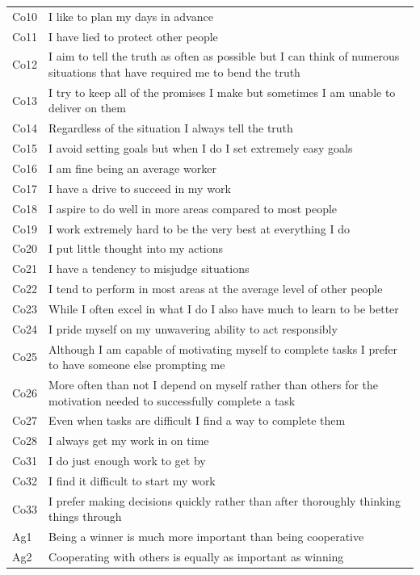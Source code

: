 \documentclass[man]{apa6}
\begin{document}
\begin{longtable}{ll}
\addlinespace
Co10 & I like to plan my days in advance\\
Co11 & I have lied to protect other people\\
Co12 & I aim to tell the truth as often as possible  but I can think of numerous situations that have required me to bend the truth\\
Co13 & I try to keep all of the promises I make  but sometimes I am unable to deliver on them\\
Co14 & Regardless of the situation  I always tell the truth\\
\addlinespace
Co15 & I avoid setting goals  but when I do  I set extremely easy goals\\
Co16 & I am fine being an average worker\\
Co17 & I have a drive to succeed in my work\\
Co18 & I aspire to do well in more areas compared to most people\\
Co19 & I work extremely hard to be the very best at everything I do\\
\addlinespace
Co20 & I put little thought into my actions\\
Co21 & I have a tendency to misjudge situations\\
Co22 & I tend to perform in most areas at the average level of other people\\
Co23 & While I often excel in what I do  I also have much to learn to be better\\
Co24 & I pride myself on my unwavering ability to act responsibly\\
\addlinespace
Co25 & Although I am capable of motivating myself to complete tasks  I prefer to have someone else prompting me\\
Co26 & More often than not  I depend on myself rather than others for the motivation needed to successfully complete a task\\
Co27 & Even when tasks are difficult  I find a way to complete them\\
Co28 & I always get my work in on time\\
Co31 & I do just enough work to get by\\
\addlinespace
Co32 & I find it difficult to start my work\\
Co33 & I prefer making decisions quickly rather than after thoroughly thinking things through\\
Ag1 & Being a winner is much more important than being cooperative\\
Ag2 & Cooperating with others is equally as important as winning\\

\end{longtable}
\end{document}
